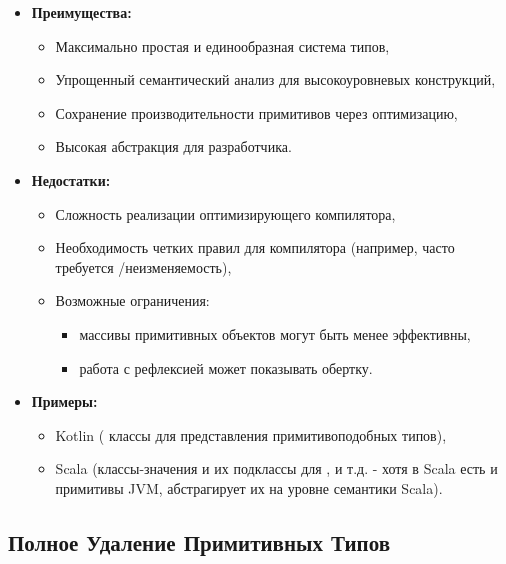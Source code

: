 \begin{itemize}[label={--}, leftmargin=*]
    \item \textbf{Преимущества:}
    \begin{itemize}[label={--}]
        \item Максимально простая и единообразная система типов,
        \item Упрощенный семантический анализ для высокоуровневых конструкций,
        \item Сохранение производительности примитивов через оптимизацию,
        \item Высокая абстракция для разработчика.
    \end{itemize}

    \item \textbf{Недостатки:}
    \begin{itemize}
        \item Сложность реализации оптимизирующего компилятора,
        \item Необходимость четких правил для компилятора (например, часто требуется /неизменяемость),
        \item Возможные ограничения:
        \begin{itemize}
            \item массивы примитивных объектов могут быть менее эффективны,
            \item работа с рефлексией может показывать обертку.
        \end{itemize}
    \end{itemize}

    \item \textbf{Примеры:}
    \begin{itemize}
        \item Kotlin ( классы для представления примитивоподобных типов),
        \item Scala (классы-значения  и их подклассы для ,  и т.д. - хотя в Scala есть и примитивы JVM,  абстрагирует их на уровне семантики Scala).
    \end{itemize}
\end{itemize}



\subsection{Полное Удаление Примитивных Типов}

